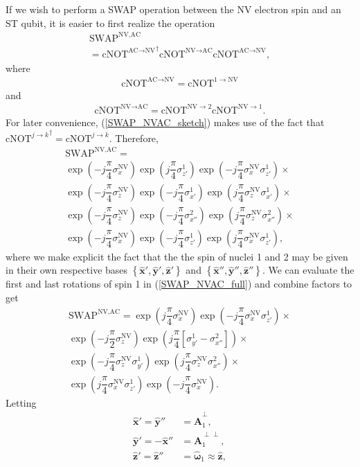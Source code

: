 \documentclass[twocolumn]{revtex4}
\renewcommand{\t}{\text} %
\newcommand{\f}[2]{\dfrac{#1}{#2}} %
\newcommand{\p}[1]{\left(#1\right)} %
\renewcommand{\sp}[1]{\left[#1\right]} %
\renewcommand{\set}[1]{\left\{#1\right\}} %
\renewcommand{\v}{\bm} %
\newcommand{\uv}[1]{\hat{\v{#1}}} %
\newcommand{\SWAP}{\t{SWAP}}
\newcommand{\cNOT}{\t{cNOT}}
\newcommand{\NV}{\t{NV}}
\newcommand{\AC}{\t{AC}}
\begin{document}
If we wish to perform a SWAP operation between the NV electron spin
and an ST qubit, it is easier to first realize the operation
\begin{multline}
  \SWAP^{\NV,\AC} \\
  = {\cNOT^{\AC\to\NV}}^\dagger\cNOT^{\NV\to\AC}\cNOT^{\AC\to\NV},
  \label{SWAP_NVAC_sketch}
\end{multline}
where
\begin{align}
  \cNOT^{\AC\to\NV} = \cNOT^{1\to\NV}
\end{align}
and
\begin{align}
  \cNOT^{\NV\to\AC} = \cNOT^{\NV\to2}\cNOT^{\NV\to1}.
\end{align}
For later convenience, (\ref{SWAP_NVAC_sketch}) makes use of the fact
that ${\cNOT^{j\to k}}^\dagger=\cNOT^{j\to k}$. Therefore,
\begin{multline}
  \SWAP^{\NV,\AC} = \\
  \exp\p{-j\f\pi4\sigma_x^\NV} \exp\p{j\f\pi4\sigma_{z'}^1}
  \exp\p{-j\f\pi4\sigma_x^\NV\sigma_{z'}^1}
  \times \\
  \exp\p{-j\f\pi4\sigma_z^\NV} \exp\p{-j\f\pi4\sigma_{x'}^1}
  \exp\p{j\f\pi4\sigma_z^\NV\sigma_{x'}^1}
  \times \\
  \exp\p{-j\f\pi4\sigma_z^\NV} \exp\p{-j\f\pi4\sigma_{x''}^2}
  \exp\p{j\f\pi4\sigma_z^\NV\sigma_{x''}^2}
  \times \\
  \exp\p{-j\f\pi4\sigma_x^\NV} \exp\p{-j\f\pi4\sigma_{z'}^1}
  \exp\p{j\f\pi4\sigma_x^\NV\sigma_{z'}^1},
  \label{SWAP_NVAC_full}
\end{multline}
where we make explicit the fact that the the spin of nuclei 1 and 2
may be given in their own respective bases
$\set{\uv x',\uv y',\uv z'}$ and $\set{\uv x'',\uv y'',\uv z''}$. We
can evaluate the first and last rotations of spin 1 in
(\ref{SWAP_NVAC_full}) and combine factors to get
\begin{multline}
  \SWAP^{\NV,\AC} = \exp\p{j\f\pi4\sigma_x^\NV}
  \exp\p{-j\f\pi4\sigma_x^\NV\sigma_{z'}^1}
  \times \\
  \exp\p{-j\f\pi2\sigma_z^\NV}
  \exp\p{j\f\pi4\sp{\sigma_{y'}^1-\sigma_{x''}^2}}
  \times \\
  \exp\p{-j\f\pi4\sigma_z^\NV\sigma_{y'}^1}
  \exp\p{j\f\pi4\sigma_z^\NV\sigma_{x''}^2}
  \times \\
  \exp\p{j\f\pi4\sigma_x^\NV\sigma_{z'}^1}
  \exp\p{-j\f\pi4\sigma_x^\NV}.
\end{multline}
Letting
\begin{align}
  \uv x' = \uv y'' &= \uv A_1^\perp, \\
  \uv y' = -\uv x'' &= \uv A_1^{\perp\perp}, \\
  \uv z' = \uv z'' &= \uv\omega_1\approx\uv z, \label{w=z}
\end{align}
\end{document}
